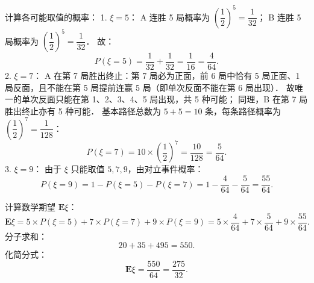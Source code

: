 \begin{answer}
计算各可能取值的概率：
1. \textbf{$\xi = 5$}：
   A 连胜 5 局概率为 $\left(\dfrac{1}{2}\right)^5 = \dfrac{1}{32}$；
   B 连胜 5 局概率为 $\left(\dfrac{1}{2}\right)^5 = \dfrac{1}{32}$．
   故：
\nopagebreak[4]
\[
P(\xi = 5) = \dfrac{1}{32} + \dfrac{1}{32} = \dfrac{1}{16} = \dfrac{4}{64}.
\]
2. \textbf{$\xi = 7$}：
   A 在第 7 局胜出终止：第 7 局必为正面，前 6 局中恰有 5 局正面、1 局反面，且不能在第 5 局提前连赢 5 局（即单次反面不能在第 6 局出现）．
   故唯一的单次反面只能在第 1、2、3、4、5 局出现，共 5 种可能；
   同理，B 在第 7 局胜出终止亦有 5 种可能．
   基本路径总数为 $5 + 5 = 10$ 条，每条路径概率为 $\left(\dfrac{1}{2}\right)^7 = \dfrac{1}{128}$：
\nopagebreak[4]
\[
P(\xi = 7) = 10 \times \left(\dfrac{1}{2}\right)^7 = \dfrac{10}{128} = \dfrac{5}{64}.
\]
3. \textbf{$\xi = 9$}：
   由于 $\xi$ 只能取值 $5, 7, 9$，由对立事件概率：
\nopagebreak[4]
\[
P(\xi = 9) = 1 - P(\xi = 5) - P(\xi = 7) = 1 - \dfrac{4}{64} - \dfrac{5}{64} = \dfrac{55}{64}.
\]

计算数学期望 $\mathbf{E}\xi$：
\nopagebreak[4]
\[
\mathbf{E}\xi = 5 \times P(\xi = 5) + 7 \times P(\xi = 7) + 9 \times P(\xi = 9) = 5 \times \dfrac{4}{64} + 7 \times \dfrac{5}{64} + 9 \times \dfrac{55}{64}.
\]
分子求和：
\nopagebreak[4]
\[
20 + 35 + 495 = 550.
\]
化简分式：
\nopagebreak[4]
\[
\mathbf{E}\xi = \dfrac{550}{64} = \dfrac{275}{32}.
\]



\end{answer}
